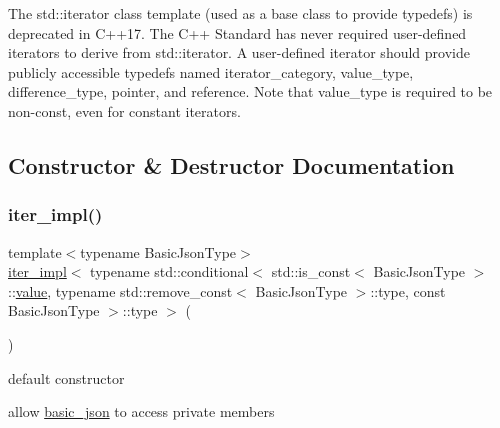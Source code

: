 The std\+::iterator class template (used as a base class to provide typedefs) is deprecated in C++17. The C++ Standard has never required user-\/defined iterators to derive from std\+::iterator. A user-\/defined iterator should provide publicly accessible typedefs named iterator\+\_\+category, value\+\_\+type, difference\+\_\+type, pointer, and reference. Note that value\+\_\+type is required to be non-\/const, even for constant iterators. 

\subsection{Constructor \& Destructor Documentation}
\mbox{\label{classnlohmann_1_1detail_1_1iter__impl_a19aa457f9c4af1b7e3af59839132cc5c}} 
\subsubsection{\texorpdfstring{iter\+\_\+impl()}{iter\_impl()}\hspace{0.1cm}{\footnotesize\ttfamily [1/3]}}
{\footnotesize\ttfamily template$<$typename Basic\+Json\+Type$>$ \\
\mbox{\hyperlink{classnlohmann_1_1detail_1_1iter__impl}{iter\+\_\+impl}}$<$ typename std\+::conditional$<$ std\+::is\+\_\+const$<$ Basic\+Json\+Type $>$\+::\mbox{\hyperlink{classnlohmann_1_1detail_1_1iter__impl_ab447c50354c6611fa2ae0100ac17845c}{value}}, typename std\+::remove\+\_\+const$<$ Basic\+Json\+Type $>$\+::type, const Basic\+Json\+Type $>$\+::type $>$ (\begin{DoxyParamCaption}{ }\end{DoxyParamCaption})\hspace{0.3cm}{\ttfamily [default]}}



default constructor 

allow \mbox{\hyperlink{classnlohmann_1_1basic__json}{basic\+\_\+json}} to access private members \mbox{\label{classnlohmann_1_1detail_1_1iter__impl_a88a00484ac201c52fc5f613d88a2918b}} 
